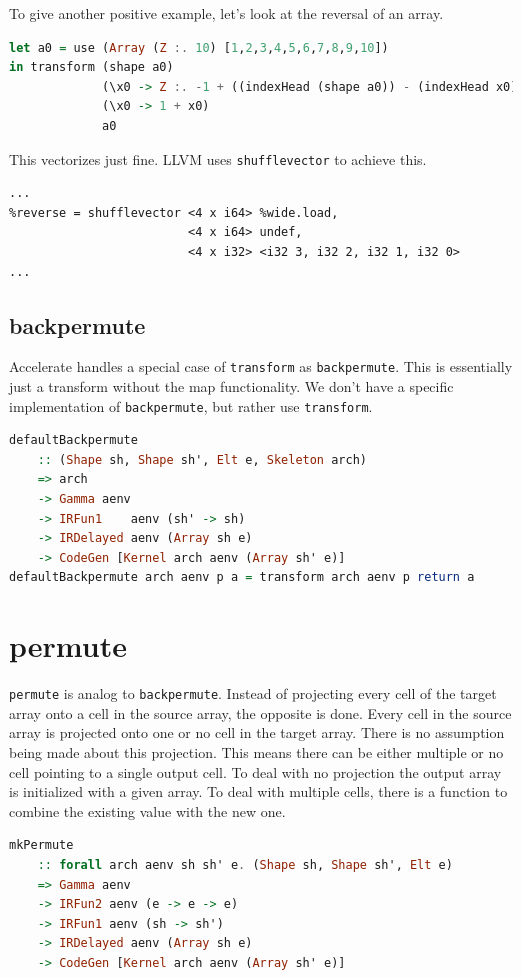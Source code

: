 \documentclass[a4paper,bibliography=totocnumbered,parskip,headsepline]{scrbook}
\begin{document}
To give another positive example, let's look at the reversal of an array.
\begin{lstlisting}[language=haskell]
let a0 = use (Array (Z :. 10) [1,2,3,4,5,6,7,8,9,10])
in transform (shape a0)
             (\x0 -> Z :. -1 + ((indexHead (shape a0)) - (indexHead x0)))
             (\x0 -> 1 + x0)
             a0
\end{lstlisting}
This vectorizes just fine.
LLVM uses \lstinline{shufflevector} to achieve this.
\begin{lstlisting}
...
%reverse = shufflevector <4 x i64> %wide.load,
                         <4 x i64> undef,
                         <4 x i32> <i32 3, i32 2, i32 1, i32 0>
...
\end{lstlisting}

\subsection{backpermute}
Accelerate handles a special case of \lstinline[language=haskell]!transform! as \lstinline[language=haskell]!backpermute!.
This is essentially just a transform without the map functionality.
We don't have a specific implementation of \lstinline[language=haskell]!backpermute!, but rather use \lstinline[language=haskell]!transform!.
\begin{lstlisting}[language=haskell]
defaultBackpermute
    :: (Shape sh, Shape sh', Elt e, Skeleton arch)
    => arch
    -> Gamma aenv
    -> IRFun1    aenv (sh' -> sh)
    -> IRDelayed aenv (Array sh e)
    -> CodeGen [Kernel arch aenv (Array sh' e)]
defaultBackpermute arch aenv p a = transform arch aenv p return a
\end{lstlisting}

\section{permute}
\lstinline[language=haskell]!permute! is analog to \lstinline[language=haskell]!backpermute!.
Instead of projecting every cell of the target array onto a cell in the source array, the opposite is done.
Every cell in the source array is projected onto one or no cell in the target array.
There is no assumption being made about this projection.
This means there can be either multiple or no cell pointing to a single output cell.
To deal with no projection the output array is initialized with a given array.
To deal with multiple cells, there is a function to combine the existing value with the new one.
\begin{lstlisting}[language=haskell]
mkPermute
    :: forall arch aenv sh sh' e. (Shape sh, Shape sh', Elt e)
    => Gamma aenv
    -> IRFun2 aenv (e -> e -> e)
    -> IRFun1 aenv (sh -> sh')
    -> IRDelayed aenv (Array sh e)
    -> CodeGen [Kernel arch aenv (Array sh' e)]
\end{lstlisting}
\end{document}
